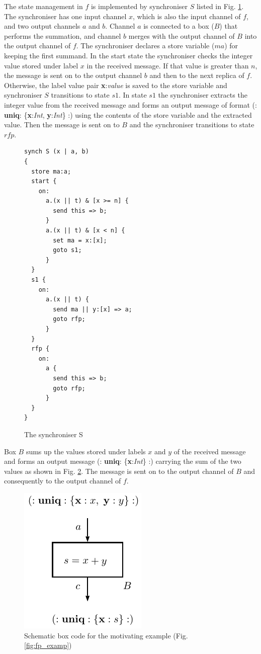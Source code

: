 The state management in $f$ is implemented by synchroniser $S$ listed in Fig. \ref{ffp:synch_s}. The synchroniser has one input channel $x$, which is also the input channel of $f$, and two output channels $a$ and $b$. Channel $a$ is connected to a box ($B$) that performs the summation, and channel $b$ merges with the output channel of $B$ into the output channel of $f$. The synchroniser declares a store variable ($ma$) for keeping the first summand. In the start state the synchroniser checks the integer value stored under label $x$ in the received message. If that value is greater than $n$, the message is sent on to the output channel $b$ and then to the next replica of $f$. Otherwise, the label value pair \textbf{x}:\emph{value} is saved to the store variable and synchroniser $S$ transitions to state $s1$. In state $s1$ the synchroniser extracts the integer value from the received message and forms an output message of format (: \textbf{uniq}: \{\textbf{x}:\emph{Int}, \textbf{y}:\emph{Int}\} :) using the contents of the store variable and the extracted value. Then the message is sent on to $B$ and the synchroniser transitions to state $rfp$.

\begin{figure}[h!]
\begin{lstlisting}[frame=single]
synch S (x | a, b)
{
  store ma:a;
  start {
    on:
      a.(x || t) & [x >= n] {
        send this => b;
      }
      a.(x || t) & [x < n] {
        set ma = x:[x];
        goto s1;
      }
  }
  s1 {
    on:
      a.(x || t) {
        send ma || y:[x] => a;
        goto rfp;
      }
  }
  rfp {
    on:
      a {
        send this => b;
        goto rfp;
      }
  }
}
\end{lstlisting}
\caption{The synchroniser S}
\label{ffp:synch_s}
\end{figure}

Box $B$ sums up the values stored under labels $x$ and $y$ of the received message and forms an output message (: \textbf{uniq}: \{\textbf{x}:\emph{Int}\} :) carrying the sum of the two values as shown in Fig. \ref{fig:fp_examp_b}. The message is sent on to the output channel of $B$ and consequently to the output channel of $f$.

\begin{figure}[h!]
\centering
\includegraphics[scale=0.8]{figs/chapter_04_fp_example_b.pdf}
\caption{Schematic box code for the motivating example (Fig. \ref{fig:fp_examp})}
\label{fig:fp_examp_b}
\end{figure}

